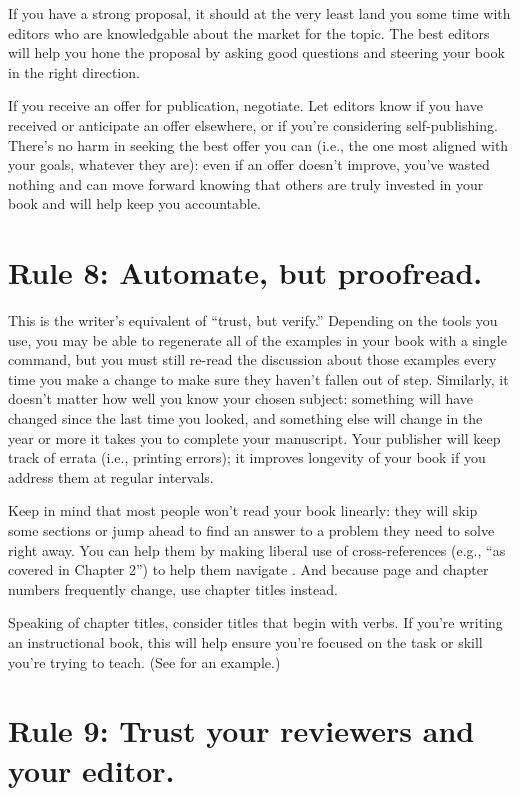 \documentclass[10pt,letterpaper]{article}
\begin{document}
If you have a strong proposal, it should at the very least land you some
time with editors who are knowledgable about the market for the topic.
The best editors will help you hone the proposal by asking good
questions and steering your book in the right direction.

If you receive an offer for publication, negotiate. Let editors know
if you have received or anticipate an offer elsewhere, or if you're
considering self-publishing. There's no harm in seeking the best offer
you can (i.e., the one most aligned with your goals, whatever they
are): even if an offer doesn't improve, you've wasted nothing and can
move forward knowing that others are truly invested in your book and
will help keep you accountable.

\section*{Rule 8: Automate, but proofread.}

This is the writer's equivalent of ``trust, but verify.''  Depending
on the tools you use, you may be able to regenerate all of the
examples in your book with a single command, but you must still
re-read the discussion about those examples every time you make a
change to make sure they haven't fallen out of step. Similarly, it
doesn't matter how well you know your chosen subject: something will
have changed since the last time you looked, and something else will
change in the year or more it takes you to complete your
manuscript. Your publisher will keep track of errata (i.e., printing
errors); it improves longevity of your book if you address them at
regular intervals.

Keep in mind that most people won't read your book linearly: they will
skip some sections or jump ahead to find an answer to a problem they
need to solve right away. You can help them by making liberal use of
cross-references (e.g., ``as covered in Chapter 2'') to help them
navigate \cite{Li2020}. And because page and chapter numbers frequently
change, use chapter titles instead.

Speaking of chapter titles, consider titles that begin with verbs. If
you're writing an instructional book, this will help ensure you're
focused on the task or skill you're trying to teach. (See \cite{Me2022}
for an example.)

\section*{Rule 9: Trust your reviewers and your editor.}
\end{document}
